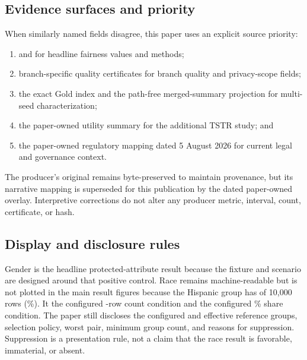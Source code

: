 \subsection{Evidence surfaces and priority}

When similarly named fields disagree, this paper uses an explicit source priority:

\begin{enumerate}
  \item {} and  for headline
        fairness values and methods;
  \item branch-specific quality certificates for branch quality and privacy-scope fields;
  \item the exact Gold index and the path-free merged-summary projection for multi-seed
    characterization;
  \item the paper-owned utility summary for the additional TSTR study; and
  \item the paper-owned regulatory mapping dated 5 August 2026 for current legal and governance
        context.
\end{enumerate}

The producer's original  remains byte-preserved to maintain
provenance, but its narrative mapping is superseded for this publication by the dated paper-owned
overlay. Interpretive corrections do not alter any producer metric, interval, count, certificate,
or hash.

\subsection{Display and disclosure rules}

Gender is the headline protected-attribute result because the fixture and scenario are designed
around that positive control. Race remains machine-readable but is not plotted in the main result
figures because the Hispanic group has \RaceMinimumGroupN{} of 10,000 rows
(\RaceMinimumGroupPct{}\%). It \RaceCountFloorRelation{} the configured
\RaceDisplayMinGroupN{}-row count condition and \RaceShareFloorRelation{} the configured
\RaceDisplayMinGroupPct{}\% share condition. The paper still discloses the configured and effective
reference groups, selection policy, worst pair, minimum group count, and reasons for suppression.
Suppression is a presentation rule, not a claim that the race result is favorable, immaterial, or
absent.
